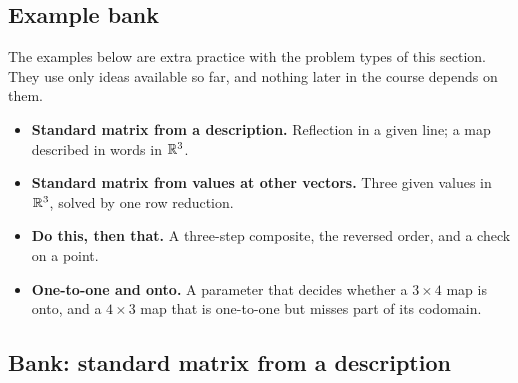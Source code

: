 \documentclass[11pt]{article}
\begin{document}
\subsection*{Example bank}

The examples below are extra practice with the problem types of this section. They use only ideas available so far, and nothing later in the course depends on them.

\begin{remark}
\begin{itemize}
  \item \textbf{Standard matrix from a description.} Reflection in a given line; a map described in words in $\mathbb{R}^3$.
  \item \textbf{Standard matrix from values at other vectors.} Three given values in $\mathbb{R}^3$, solved by one row reduction.
  \item \textbf{Do this, then that.} A three-step composite, the reversed order, and a check on a point.
  \item \textbf{One-to-one and onto.} A parameter that decides whether a $3\times4$ map is onto, and a $4\times3$ map that is one-to-one but misses part of its codomain.
\end{itemize}
\end{remark}

\subsection*{Bank: standard matrix from a description}
\end{document}
